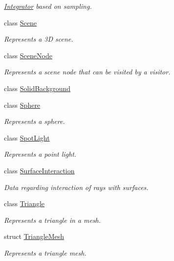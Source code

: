 \begin{DoxyCompactItemize}
\begin{DoxyCompactList}\small\item\em \mbox{\hyperlink{classomg_1_1_integrator}{Integrator}} based on sampling. \end{DoxyCompactList}\item 
class \mbox{\hyperlink{classomg_1_1_scene}{Scene}}
\begin{DoxyCompactList}\small\item\em Represents a 3D scene. \end{DoxyCompactList}\item 
class \mbox{\hyperlink{classomg_1_1_scene_node}{Scene\+Node}}
\begin{DoxyCompactList}\small\item\em Represents a scene node that can be visited by a visitor. \end{DoxyCompactList}\item 
class \mbox{\hyperlink{classomg_1_1_solid_background}{Solid\+Background}}
\item 
class \mbox{\hyperlink{classomg_1_1_sphere}{Sphere}}
\begin{DoxyCompactList}\small\item\em Represents a sphere. \end{DoxyCompactList}\item 
class \mbox{\hyperlink{classomg_1_1_spot_light}{Spot\+Light}}
\begin{DoxyCompactList}\small\item\em Represents a point light. \end{DoxyCompactList}\item 
class \mbox{\hyperlink{classomg_1_1_surface_interaction}{Surface\+Interaction}}
\begin{DoxyCompactList}\small\item\em Data regarding interaction of rays with surfaces. \end{DoxyCompactList}\item 
class \mbox{\hyperlink{classomg_1_1_triangle}{Triangle}}
\begin{DoxyCompactList}\small\item\em Represents a triangle in a mesh. \end{DoxyCompactList}\item 
struct \mbox{\hyperlink{structomg_1_1_triangle_mesh}{Triangle\+Mesh}}
\begin{DoxyCompactList}\small\item\em Represents a triangle mesh. \end{DoxyCompactList}\item 

\end{DoxyCompactItemize}
